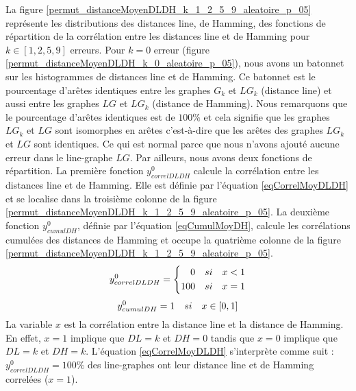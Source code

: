 La figure \ref{permut_distanceMoyenDLDH_k_1_2_5_9_aleatoire_p_05} repr\'esente les distributions des distances line, de Hamming, des fonctions de r\'epartition de la corr\'elation entre les distances line et  de Hamming pour $k \in [1,2,5,9]$ erreurs. 
\newline
Pour $k=0$ erreur (figure \ref{permut_distanceMoyenDLDH_k_0_aleatoire_p_05}), nous avons un batonnet sur les histogrammes de distances line et de Hamming. Ce batonnet est le pourcentage d'ar\^etes identiques entre les graphes $G_k$ et $LG_k$ (distance line) et aussi entre les graphes  $LG$ et $LG_k$ (distance de Hamming). Nous remarquons que le pourcentage d'ar\^etes identiques est de $100\%$ et cela signifie que les graphes $LG_k$ et $LG$ sont isomorphes en ar\^etes c'est-\`a-dire que les ar\^etes des graphes $LG_k$ et $LG$ sont identiques. Ce qui est normal parce que nous n'avons ajout\'e aucune erreur dans le line-graphe $LG$. 
Par ailleurs, nous avons deux fonctions de r\'epartition. La premi\`ere fonction $y_{correlDLDH}^{0}$ calcule la corr\'elation entre les distances line et de Hamming. Elle est d\'efinie par l'\'equation \ref{eqCorrelMoyDLDH} et se localise dans la troisi\`eme colonne de la figure \ref{permut_distanceMoyenDLDH_k_1_2_5_9_aleatoire_p_05}. La deuxi\`eme fonction $y_{cumulDH}^{0}$, d\'efinie par l'\'equation \ref{eqCumulMoyDH}, calcule les corr\'elations cumul\'ees des distances de Hamming et occupe la quatri\`eme colonne de la figure \ref{permut_distanceMoyenDLDH_k_1_2_5_9_aleatoire_p_05}.
\begin{equation}
\label{eqCorrelMoyDLDH}
y_{correlDLDH}^{0} = \left\{
	\begin{aligned}
	0 \hspace{1 em} si \hspace{1 em} x < 1 \\
	100  \hspace{1 em}  si  \hspace{1 em}  x = 1
	\end{aligned}
	\right.
\end{equation}
\begin{equation}
\label{eqCumulMoyDH}
y_{cumulDH}^{0} = 1  \hspace{1 em}  si  \hspace{1 em}   x \in [0,1]
\end{equation}
La variable $x$ est la corr\'elation entre la distance line et la distance de Hamming.
En effet,  $x = 1$ implique que $DL = k$ et $DH = 0$ tandis que  $x = 0$ implique que $DL = k$ et $DH = k$.
L'\'equation  \ref{eqCorrelMoyDLDH} s'interpr\`ete comme suit : $y_{correlDLDH}^{0} = 100\%$ des line-graphes ont leur distance line et de Hamming correl\'ees ($x = 1$).

